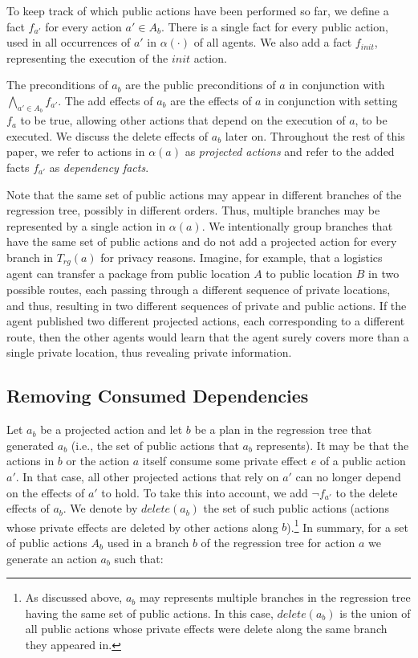 \documentclass[letterpaper]{article}
\newcommand{\delete}{\textit{delete}}
\theoremstyle{definition}
\begin{document}
To keep track of which public actions have been performed so far, we define a fact $f_{a'}$ for every action $a'\in A_b$. There is a single fact for every public action, used in all occurrences of $a'$ in $\alpha(\cdot)$ of all agents. We also add a fact $f_{init}$, representing the execution of the $init$ action.

The preconditions of $a_b$ are the public preconditions of $a$
in conjunction with $\bigwedge_{a' \in A_b}f_{a'}$.
The add effects of $a_b$ are the effects of $a$ in conjunction with setting $f_a$ to be true, allowing other actions that depend on the execution of $a$, to be executed. We discuss the delete effects of $a_b$ later on.
Throughout the rest of this paper, we refer to actions in $\alpha(a)$ as {\em projected actions} and refer to the added facts $f_{a'}$ as {\em dependency facts}.




Note that the same set of public actions may appear in different branches of the regression tree, possibly in different orders. Thus, multiple branches may be represented by a single action in $\alpha(a)$.
We intentionally group branches that have the same set of public actions and do not add a projected action for every branch in $T_{rg}(a)$ for privacy reasons. Imagine, for example, that a logistics agent can transfer a package from public location $A$ to public location $B$ in two possible routes, each passing through a different sequence of private locations, and thus, resulting in two different sequences of private and public actions. If the agent published two different projected actions, each corresponding to a different route, then the other agents would learn that the agent surely covers more than a single private location, thus revealing private information.











\subsection{Removing Consumed Dependencies}
\label{sec:removingConsumed}
Let $a_b$ be a projected action and let $b$ be a plan in the regression tree that generated $a_b$ (i.e., the set of public actions that $a_b$ represents). It may be that the actions in $b$ or the action $a$ itself consume some private effect $e$ of a public action $a'$. In that case, all other projected actions that rely on $a'$ can no longer depend on the effects of $a'$ to hold. To take this into account, we add $\neg f_{a'}$ to the delete effects of $a_b$. We denote by $\delete (a_b)$ the set of such public actions (actions whose private effects are deleted by other actions along $b$).\footnote{As discussed above, $a_b$ may represents multiple branches in the regression tree having the same set of public actions. In this case, $\delete (a_b)$ is the union of all public actions whose private effects were delete along the same branch they appeared in.} In summary, for a set of public actions $A_b$ used in a branch $b$ of the regression tree for action $a$ we generate an action $a_b$ such that:
\end{document}
